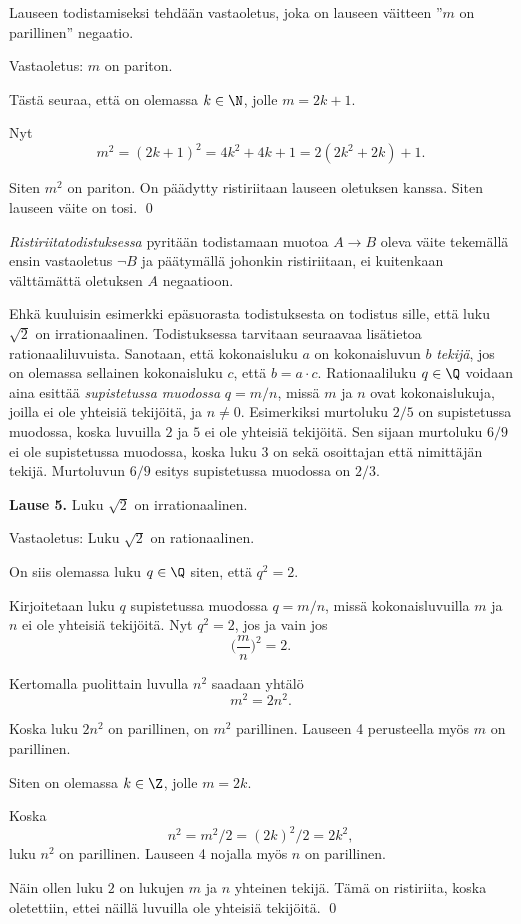 \proof
Lauseen todistamiseksi tehdään vastaoletus, joka on lauseen väitteen ''$m$ on parillinen'' negaatio.

Vastaoletus: $m$ on pariton.

Tästä seuraa, että on olemassa $k\in \N$, jolle $m=2k+1$.

Nyt
\[
m^2 = (2k+1)^2 = 4k^2+4k+1 = 2(2k^2+2k)+1.
\]

Siten $m^2$ on pariton. On päädytty ristiriitaan lauseen oletuksen kanssa. Siten lauseen väite on tosi.
\qed

{\em Ristiriitatodistuksessa} pyritään todistamaan muotoa $A\to B$ oleva väite tekemällä ensin vastaoletus $\lnot B$ ja päätymällä johonkin ristiriitaan, ei kuitenkaan välttämättä oletuksen $A$ negaatioon.

Ehkä kuuluisin esimerkki epäsuorasta todistuksesta on todistus sille, että luku $\sqrt{2}$ on irrationaalinen. Todistuksessa tarvitaan seuraavaa lisätietoa rationaaliluvuista. Sanotaan, että kokonaisluku $a$ on kokonaisluvun $b$ {\em tekijä}, jos on olemassa sellainen kokonaisluku $c$, että $b=a\cdot c$. Rationaaliluku $q\in\Q$ voidaan aina esittää {\em supistetussa muodossa} $q=m/n$, missä $m$ ja $n$ ovat kokonaislukuja, joilla ei ole yhteisiä tekijöitä, ja $n\neq 0$. Esimerkiksi murtoluku $2/5$ on supistetussa muodossa, koska luvuilla $2$ ja $5$ ei ole yhteisiä tekijöitä. Sen sijaan murtoluku $6/9$ ei ole supistetussa muodossa, koska luku $3$ on sekä osoittajan että nimittäjän tekijä. Murtoluvun $6/9$ esitys supistetussa muodossa on $2/3$.

{\bf Lause 5.} Luku $\sqrt{2}$ on irrationaalinen.

\proof
Vastaoletus: Luku $\sqrt{2}$ on rationaalinen.

On siis olemassa luku $q\in \Q$ siten, että $q^2=2$.

Kirjoitetaan luku $q$ supistetussa muodossa $q=m/n$, missä kokonaisluvuilla $m$ ja $n$ ei ole yhteisiä tekijöitä. Nyt $q^2=2$, jos ja vain jos
\[
\bigg(\frac{m}{n}\bigg)^2=2.
\]

Kertomalla puolittain luvulla $n^2$ saadaan yhtälö
\[
m^2 = 2n^2.
\]

Koska luku $2n^2$ on parillinen, on $m^2$ parillinen. Lauseen 4 perusteella myös $m$ on parillinen.

Siten on olemassa $k\in \Z$, jolle $m=2k$.

Koska
\[
n^2=m^2/2=(2k)^2/2= 2k^2,
\]
luku $n^2$ on parillinen. Lauseen 4 nojalla myös $n$ on parillinen.

Näin ollen luku $2$ on lukujen $m$ ja $n$ yhteinen tekijä. Tämä on ristiriita, koska oletettiin, ettei näillä luvuilla ole yhteisiä tekijöitä.
\qed


